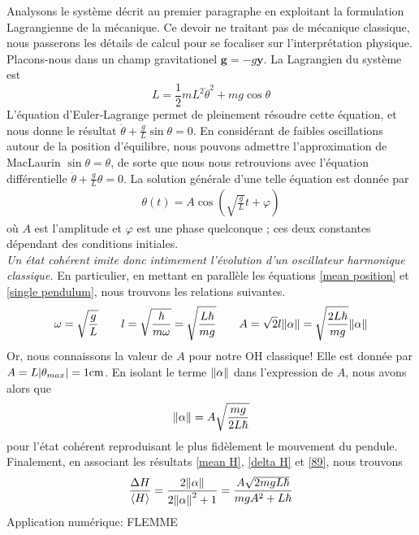 \documentclass[11pt,oneside,a4paper]{article}
\newcommand{\h}{\ensuremath{\hbar}}
\begin{document}
Analysons le système décrit au premier paragraphe en exploitant la formulation Lagrangienne de la mécanique. Ce devoir ne traitant pas de mécanique classique, nous passerons les détails de calcul pour se focaliser sur l'interprétation physique. Placons-nous dans un champ gravitationel $\bm{g} = -g\bm{\bm{y}}$. La Lagrangien du système est 
\begin{equation}
  L = \frac{1}{2}mL^2\dot{\theta}^2 + mg\cos\theta 
\end{equation}
L'équation d'Euler-Lagrange permet de pleinement résoudre cette équation, et nous donne le résultat $\ddot{\theta} + \frac{g}{L}\sin\theta =  0$. En considérant de faibles oscillations autour de la position d'équilibre, nous pouvons admettre l'approximation de MacLaurin $\sin\theta=\theta$, de sorte que nous nous retrouvions avec l'équation différentielle $\ddot{\theta} + \frac{g}{L}\theta = 0$. La solution générale d'une telle équation est donnée par
\begin{align}
  \label{single pendulum}
  \theta(t) = A\cos(\sqrt{\frac{g}{L}}t+\varphi)
\end{align}
où $A$ est l'amplitude et $\varphi$ est une phase quelconque ; ces deux constantes dépendant des conditions initiales.\\

\emph{Un état cohérent imite donc intimement l'évolution d'un oscillateur harmonique classique.} En particulier, en mettant en parallèle les équations \eqref{mean position} et \eqref{single pendulum}, nous trouvons les relations suivantes.
\begin{equation}
  \omega = \sqrt{\frac{g}{L}}\qquad
  l = \sqrt{\frac{\h}{m\omega}} = \sqrt{\frac{L\h}{mg}}\qquad
  A = \sqrt{2}l\norm{\alpha} = \sqrt{\frac{2L\h}{mg}}\norm{\alpha}
\end{equation}
Or, nous connaissons la valeur de $A$ pour notre OH classique! Elle est donnée par $A = L\absolutevalue{\theta_{max}} = 1\si{cm}$. En isolant le terme $\norm{\alpha}$ dans l'expression de $A$, nous avons alors que
\begin{equation}
  \label{89}
  \norm{\alpha}= A\sqrt{\frac{mg}{2L\h}}
\end{equation}
pour l'état cohérent reproduisant le plus fidèlement le mouvement du pendule.\\

Finalement, en associant les résultats \eqref{mean H}, \eqref{delta H} et \eqref{89}, nous trouvons
\begin{equation}
  \frac{\Delta H}{\expval{H}} = \frac{2\norm{\alpha}}{2\norm{\alpha}^2+1} = \frac{A\sqrt{2mgL\h}}{mgA^2+L\h}
\end{equation}
Application numérique: FLEMME
\end{document}
